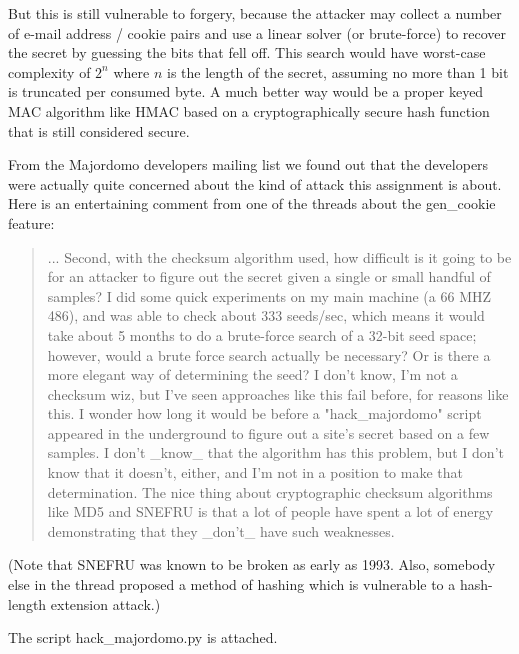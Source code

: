 \documentclass{article}
\begin{document}
But this is still vulnerable to forgery, because the attacker may collect a number of e-mail address / cookie pairs and use a linear solver (or brute-force) to recover the secret by guessing the bits that fell off.
This search would have worst-case complexity of $2^n$ where $n$ is the length of the secret, assuming no more than 1 bit is truncated per consumed byte.
A much better way would be a proper keyed MAC algorithm like HMAC based on a cryptographically secure hash function that is still considered secure.

From the Majordomo developers mailing list we found out that the developers were actually quite concerned about the kind of attack this assignment is about.
Here is an entertaining comment from one of the threads about the gen\_cookie feature:
\begin{quotation}
	...
	Second, with the checksum algorithm used, how difficult is it going to be
	for an attacker to figure out the secret given a single or small handful of
	samples?  I did some quick experiments on my main machine (a 66 MHZ 486),
	and was able to check about 333 seeds/sec, which means it would take about
	5 months to do a brute-force search of a 32-bit seed space; however, would
	a brute force search actually be necessary?  Or is there a more elegant way
	of determining the seed?  I don't know, I'm not a checksum wiz, but I've
	seen approaches like this fail before, for reasons like this.  I wonder how
	long it would be before a "hack\_majordomo" script appeared in the
	underground to figure out a site's secret based on a few samples.  I don't
	\_know\_ that the algorithm has this problem, but I don't know that it
	doesn't, either, and I'm not in a position to make that determination.  The
	nice thing about cryptographic checksum algorithms like MD5 and SNEFRU is
	that a lot of people have spent a lot of energy demonstrating that they
	\_don't\_ have such weaknesses.
\end{quotation}
\cite{majordomo_thread}
(Note that SNEFRU was known to be broken as early as 1993. Also, somebody else in the thread proposed a method of hashing which is vulnerable to a hash-length extension attack.)

The script hack\_majordomo.py is attached.

\section{}



 
\end{document}
